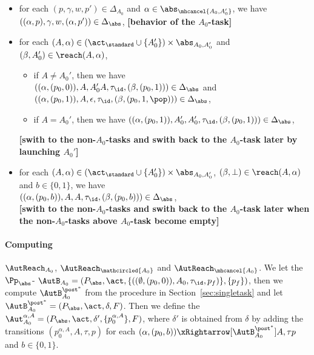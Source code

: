 \begin{itemize}
    \item for each $(p,\gamma,w,p')\in\Delta_{A_0}$ and $\alpha\in\abs_{\mhcancel{A_0,A_0'}}$, we have $((\alpha,p),\gamma,w,(\alpha,p'))\in\Delta_{\abs}$, \textbf{[behavior of the $A_0$-task]}
    \item for each $(A,\alpha)\in(\act_{\standard}\cup\{A_0'\})\times\abs_{A_0,A_0'}$ and $(\beta,A_0')\in\reach(A,\alpha)$, 
        \begin{itemize}
            \item if $A\neq A_0'$, then we have \\
                $((\alpha,(p_0,0)),A,A_0'A,\tau_{\id},(\beta,(p_0,1)))\in\Delta_{\abs}$ and $((\alpha,(p_0,1)),A,\epsilon,\tau_{\id},(\beta,(p_0,1,\pop)))\in\Delta_{\abs}$,
            \item if $A=A_0'$, then we have $((\alpha,(p_0,1)),A_0',A_0',\tau_{\id},(\beta,(p_0,1)))\in\Delta_{\abs}$,
        \end{itemize}
                \textbf{[swith to the non-$A_0$-tasks and swith back to the $A_0$-task later by launching $A_0'$]}
    \item for each $(A,\alpha)\in(\act_{\standard}\cup\{A_0'\})\times\abs_{A_0,A_0'}$, $(\beta,\bot)\in\reach(A,\alpha)$ and $b\in\{0,1\}$, we have \\
        $((\alpha,(p_0,b)),A,A,\tau_{\id},(\beta,(p_0,b)))\in\Delta_{\abs}$,\\
            \textbf{[swith to the non-$A_0$-tasks and swith back to the $A_0$-task later when the non-$A_0$-tasks above $A_0$-task become empty]}
\end{itemize}

\paragraph{Computing} $\AutReach_{A_0}$, $\AutReach_{\mathcircled{A_0}}$ and $\AutReach_{\mhcancel{A_0}}$.
We let the $\Pp_{\abs}$-{\WOTrNFA} $\AutB_{A_0} = (P_{\abs}, \act, \{((\emptyset,(p_0,0)), A_0, \tau_{\id}, p_f)\}, \{p_f\})$, then we compute $\AutB_{A_0}^{\post^*}$ from the procedure in Section~\ref{sec:singletask} and let $\AutB_{A_0}^{\post^*} = (P_{\abs},\act,\delta,F)$. Then we define the {\WOTrNFA} $\Aut_{A_0}^{\alpha,A} = (P_{\abs},\act,\delta',\{p_0^{\alpha,A}\},F)$, where $\delta'$ is obtained from $\delta$ by adding the transitions $(p_0^{\alpha,A},A,\tau,p)$ for each $(\alpha,(p_0,b))\xRightarrow[\AutB_{A_0}^{\post^*}]{A,\tau}p$ and $b\in\{0,1\}$.


